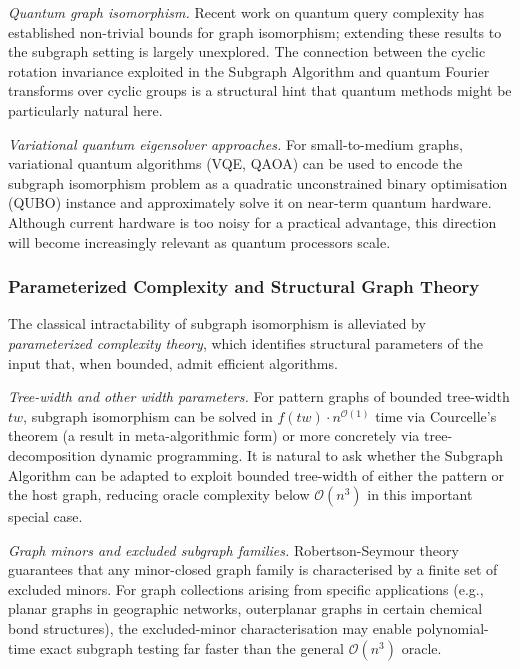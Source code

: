﻿\documentclass[12pt,a4paper]{article}
\theoremstyle{plain}
\theoremstyle{definition}
\theoremstyle{remark}
\begin{document}
	\emph{Quantum graph isomorphism.}  Recent work on quantum query complexity
	has established non-trivial bounds for graph isomorphism; extending these
	results to the subgraph setting is largely unexplored.  The connection
	between the cyclic rotation invariance exploited in the Subgraph Algorithm
	and quantum Fourier transforms over cyclic groups is a structural hint
	that quantum methods might be particularly natural here.

	\emph{Variational quantum eigensolver approaches.}  For small-to-medium
	graphs, variational quantum algorithms (VQE, QAOA) can be used to encode
	the subgraph isomorphism problem as a quadratic unconstrained binary
	optimisation (QUBO) instance and approximately solve it on near-term
	quantum hardware.  Although current hardware is too noisy for a practical
	advantage, this direction will become increasingly relevant as quantum
	processors scale.

	\subsubsection*{Parameterized Complexity and Structural Graph Theory}

	The classical intractability of subgraph isomorphism is alleviated by
	\emph{parameterized complexity theory}, which identifies structural
	parameters of the input that, when bounded, admit efficient algorithms.

	\emph{Tree-width and other width parameters.}  For pattern graphs of
	bounded tree-width $tw$, subgraph isomorphism can be solved in
	$f(tw) \cdot n^{\mathcal{O}(1)}$ time via Courcelle's theorem (a result
	in meta-algorithmic form) or more concretely via tree-decomposition
	dynamic programming.  It is natural to ask whether the Subgraph Algorithm
	can be adapted to exploit bounded tree-width of either the pattern or the
	host graph, reducing oracle complexity below $\mathcal{O}(n^3)$ in this
	important special case.

	\emph{Graph minors and excluded subgraph families.}  Robertson-Seymour
	theory guarantees that any minor-closed graph family is characterised by a
	finite set of excluded minors.  For graph collections arising from
	specific applications (e.g., planar graphs in geographic networks, outerplanar
	graphs in certain chemical bond structures), the excluded-minor characterisation
	may enable polynomial-time exact subgraph testing far faster than the general
	$\mathcal{O}(n^3)$ oracle.
\end{document}
